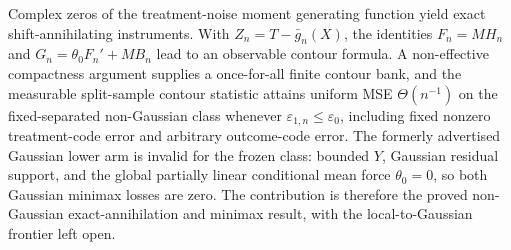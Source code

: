 Complex zeros of the treatment-noise moment generating function yield exact shift-annihilating instruments.  With \(Z_n=T-\bar g_n(X)\), the identities \(F_n=M H_n\) and \(G_n=\theta_0F_n'+M B_n\) lead to an observable contour formula.  A non-effective compactness argument supplies a once-for-all finite contour bank, and the measurable split-sample contour statistic attains uniform MSE \(\Theta(n^{-1})\) on the fixed-separated non-Gaussian class whenever \(\varepsilon_{1,n}\le\varepsilon_0\), including fixed nonzero treatment-code error and arbitrary outcome-code error.  The formerly advertised Gaussian lower arm is invalid for the frozen class: bounded \(Y\), Gaussian residual support, and the global partially linear conditional mean force \(\theta_0=0\), so both Gaussian minimax losses are zero.  The contribution is therefore the proved non-Gaussian exact-annihilation and minimax result, with the local-to-Gaussian frontier left open.